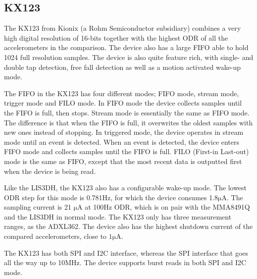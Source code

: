 \subsection{KX123}

The KX123 from Kionix (a Rohm Semiconductor subsidiary) combines a very high digital resolution of 16-bits together with the highest ODR of all the accelerometers in the comparison. The device also has a large FIFO able to hold 1024 full resolution samples. The device is also quite feature rich, with single- and double tap detection, free fall detection as well as a motion activated wake-up mode.

The FIFO in the KX123 has four different modes; FIFO mode, stream mode, trigger mode and FILO mode. In FIFO mode the device collects samples until the FIFO is full, then stops. Stream mode is essentially the same as FIFO mode. The difference is that when the FIFO is full, it overwrites the oldest samples with new ones instead of stopping. In triggered mode, the device operates in stream mode until an event is detected. When an event is detected, the device enters FIFO mode and collects samples until the FIFO is full. FILO (First-in Last-out) mode is the same as FIFO, except that the most recent data is outputted first when the device is being read.

Like the LIS3DH, the KX123 also has a configurable wake-up mode. The lowest ODR step for this mode is 0.781Hz, for which the device consumes 1.8$\si{\micro\ampere}$. The sampling current is 21 $\si{\micro\ampere}$ at 100Hz ODR, which is on pair with the MMA8491Q and the LIS3DH in normal mode. The KX123 only has three measurement ranges, as the ADXL362. The device also has the highest shutdown current of the compared accelerometers, close to $1\si{\micro\ampere}$. 

The KX123 has both SPI and I2C interface, whereas the SPI interface that goes all the way up to 10MHz. The device supports burst reads in both SPI and I2C mode.